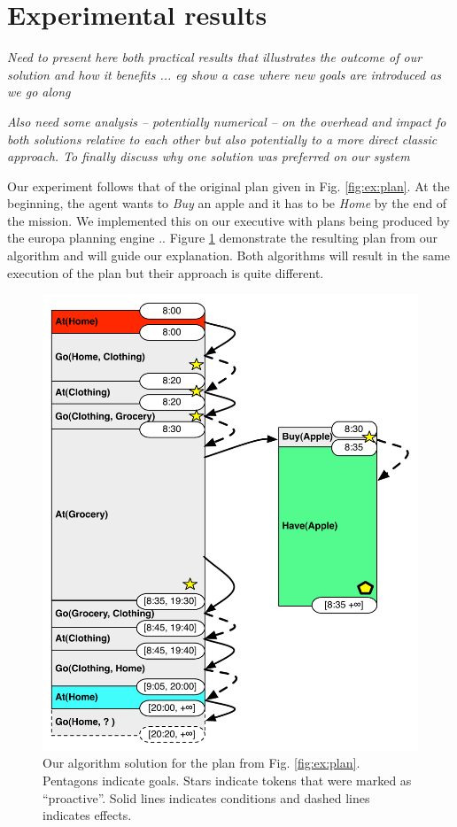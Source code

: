 
\section{Experimental results}
\label{sec:exp}

{\em\color{gray} Need to present here both practical results that illustrates the outcome of our solution and how it benefits ... eg show a case where new goals are introduced as we go along}

{\em\color{gray} Also need some analysis -- potentially numerical -- on the overhead and impact fo both solutions relative to each other but also potentially to a more direct classic approach. 
To finally discuss why one solution was preferred on our system} 

Our experiment follows that of the original plan given in
Fig. \ref{fig:ex:plan}. At the beginning, the agent wants to {\em Buy}
an apple and it has to be {\em Home} by the end of the mission. We
implemented this on our executive with plans being produced by the
europa planning engine \cite{frank2003}.. Figure \ref{fig:ex:mixed1}
demonstrate the resulting plan from our algorithm and will guide our
explanation. Both algorithms will result in the same execution of the
plan but their approach is quite different.

\begin{figure}
  \centering
  \includegraphics[width=0.8\columnwidth]{figs/example_MixedInitial}
  \caption{Our algorithm solution for the plan from
    Fig. \ref{fig:ex:plan}. Pentagons indicate goals. Stars indicate tokens that were marked
  as ``proactive''. Solid lines indicates conditions and dashed lines indicates effects.}
  \label{fig:ex:mixed1}
\end{figure}

